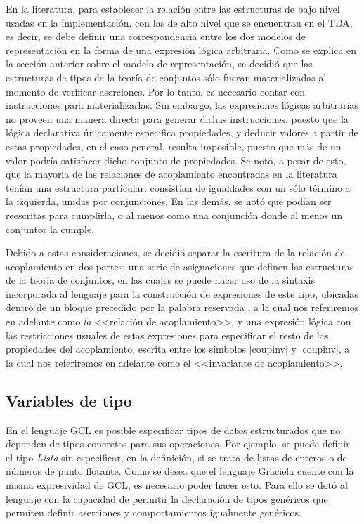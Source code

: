{{En la literatura, para establecer la relación entre las estructuras de bajo
nivel usadas en la implementación, con las de alto nivel que se encuentran en el
TDA, es decir, se debe definir una correspondencia entre los dos modelos de
representación en la forma de una expresión lógica arbitraria. Como se explica
en la sección anterior sobre el modelo de representación, se decidió que las
estructuras de tipos de la teoría de conjuntos sólo fueran materializadas al
momento de verificar aserciones. Por lo tanto, es necesario contar con
instrucciones para materializarlas. Sin embargo, las expresiones lógicas
arbitrarias no proveen una manera directa para generar dichas instrucciones,
puesto que la lógica declarativa únicamente especifica propiedades, y deducir
valores a partir de estas propiedades, en el caso general, resulta imposible,
puesto que más de un valor podría satisfacer dicho conjunto de propiedades. Se
notó, a pesar de esto, que la mayoría de las relaciones de acoplamiento
encontradas en la literatura tenían una estructura particular: consistían de
igualdades con un sólo término a la izquierda, unidas por conjunciones. En las
demás,  se notó que podían ser reescritas para cumplirla, o al menos como una
conjunción donde al menos un conjuntor la cumple.

Debido a estas consideraciones, se decidió separar la escritura de la relación
de acoplamiento en dos partes: una serie de asignaciones que definen las
estructuras de la teoría de conjuntos, en las cuales se puede hacer uso de la
sintaxis incorporada al lenguaje para la construcción de expresiones de este
tipo, ubicadas dentro de un bloque  precedido por la palabra reservada
, a la cual nos referiremos en adelante como \textit{la}
<<relación de acoplamiento>>, y una expresión lógica con las restricciones
usuales de estas expresiones para especificar el resto de las propiedades del
acoplamiento, escrita entre los símbolos \ingra|{coupinv| y
\ingra|coupinv}|, a la cual nos referiremos en adelante como el <<invariante
de acoplamiento>>.

\subsection{Variables de tipo}

En el lenguaje GCL es posible especificar tipos de datos estructurados que no
dependen de tipos concretos para sus operaciones. Por ejemplo, se puede definir
el tipo \textit{Lista} sin  especificar, en la definición, si se trata de listas
de enteros o de números de punto flotante. Como se desea que el lenguaje
Graciela cuente con la misma expresividad de GCL, es necesario poder hacer esto.
Para ello se dotó al lenguaje con la capacidad de permitir la declaración de
tipos genéricos que permiten definir aserciones y comportamientos igualmente
genéricos.

}}

